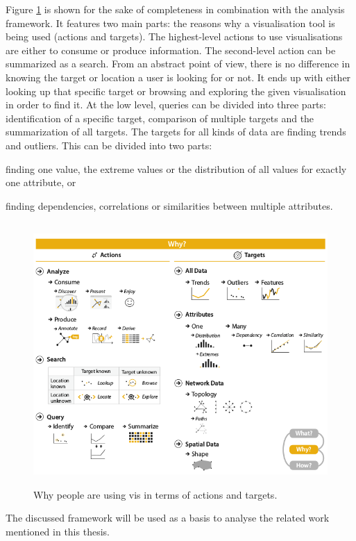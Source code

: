 Figure \ref{fig:why} is shown for the sake of completeness in combination with the analysis framework. It features two main parts: the reasons why a visualisation tool is being used (actions and targets). The highest-level actions to use visualisations are either to consume or produce information. The second-level action can be summarized as a search. From an abstract point of view, there is no difference in knowing the target or location a user is looking for or not. It ends up with either looking up that specific target or browsing and exploring the given visualisation in order to find it. At the low level, queries can be divided into three parts: identification of a specific target, comparison of multiple targets and the summarization of all targets.
The targets for all kinds of data are finding trends and outliers. This can be divided into two parts:
\begin{enumerate*}[label={(\arabic*)}]
\item finding one value, the extreme values or the distribution of all values for exactly one attribute, or
\item finding dependencies, correlations or similarities between multiple attributes.
\end{enumerate*}

\begin{figure}[!htb]
\centering
\includegraphics[height=10cm,keepaspectratio]{images/basics/why.png}
\caption[
    Why people are using vis in terms of actions and targets .
]{Why people are using vis in terms of actions and targets.}
\label{fig:why}
\end{figure}

The discussed framework will be used as a basis to analyse the related work mentioned in this thesis.

